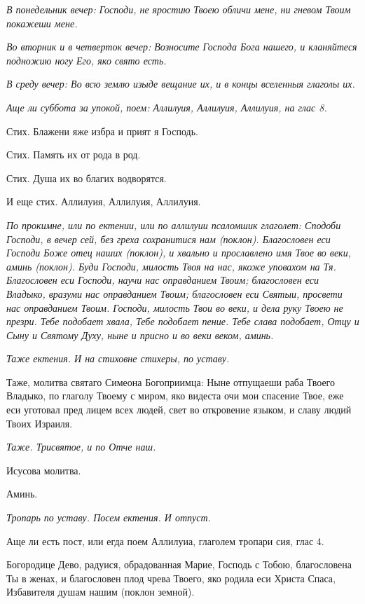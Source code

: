 \itshape В понедельник вечер:\normalfont{} Господи, не яростию Твоею обличи мене, ни гневом Твоим покажеши мене.


\itshape Во вторник и в четверток вечер:\normalfont{} Возносите Господа Бога нашего, и кланяйтеся подножию ногу Его, яко свято есть.


\itshape В среду вечер:\normalfont{} Во всю землю изыде вещание их, и в концы вселенныя глаголы их.


\itshape Аще ли суббота за упокой, поем:\normalfont{} Аллилуия, Аллилуия, Аллилуия, на глас 8.

Стих. Блажени яже избра и прият я Господь.

Стих. Память их от рода в род.

Стих. Душа их во благих водворятся.

И еще стих. Аллилуия, Аллилуия, Аллилуия.


\medskip\itshape По прокимне, или по ектении, или по аллилуии псаломшик глаголет:\normalfont{} Сподоби Господи, в вечер сей, без греха сохранитися нам (поклон). Благословен еси Господи Боже отец наших (поклон), и хвально и прославлено имя Твое во веки, аминь (поклон). Буди Господи, милость Твоя на нас, якоже уповахом на Тя. Благословен еси  Господи, научи нас оправданием Твоим; благословен еси Владыко, вразуми нас оправданием Твоим; благословен еси Святыи, просвети нас оправданием Твоим. Господи, милость Твои во веки, и дела руку Твоею не презри. Тебе подобает хвала, Тебе подобает пение. Тебе слава подобает, Отцу и Сыну и Святому Духу, ныне и присно и во веки веком, аминь.


\medskip\itshape Таже ектения. И на стиховне стихеры, по уставу.

Таже, молитва святаго Симеона Богоприимца:\normalfont{} Ныне отпущаеши раба Твоего Владыко, по глаголу Твоему с миром, яко видеста очи мои спасение Твое, еже еси уготовал пред лицем всех людей, свет во откровение языком, и славу людий Твоих Израиля.

\itshape Таже. Трисвятое, и по Отче наш.\normalfont{}

Исусова молитва.

Аминь.

\itshape Тропарь по уставу. Посем ектения. И отпуст.

Аще ли есть пост, или егда поем Аллилуиа, глаголем тропари сия, глас 4.\normalfont{}

Богородице Дево, радуися, обрадованная Марие, Господь с Тобою, благословена Ты в женах, и благословен плод чрева Твоего, яко родила еси Христа Спаса, Избавителя душам нашим (поклон земной).

